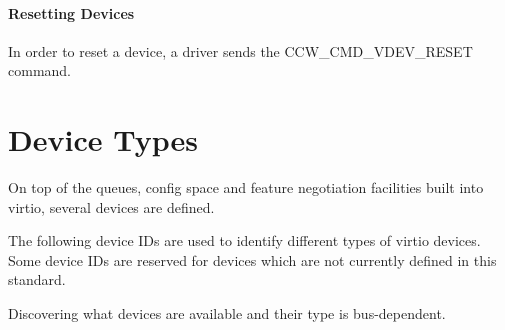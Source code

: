 \subsubsection{Resetting Devices}\label{sec:Virtio Transport Options / Virtio over channel I/O / Device Operation / Resetting Devices}

In order to reset a device, a driver sends the
CCW_CMD_VDEV_RESET command.


\chapter{Device Types}\label{sec:Device Types}

On top of the queues, config space and feature negotiation facilities
built into virtio, several devices are defined.

The following device IDs are used to identify different types of virtio
devices.  Some device IDs are reserved for devices which are not currently
defined in this standard.

Discovering what devices are available and their type is bus-dependent.

